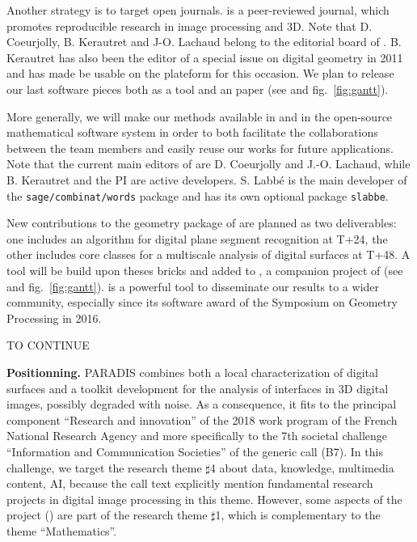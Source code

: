 Another strategy is to target open journals. {\IPOL} is a peer-reviewed journal, which promotes
reproducible research in image processing and 3D. Note that D. Coeurjolly, B. Kerautret and J-O. Lachaud
belong to the editorial board of {\IPOL}. B. Kerautret has also been the editor of a special issue on
digital geometry in 2011 and has made {\DGtal} be usable on the {\IPOL} plateform for this occasion. 
We plan to release our last software pieces both as a {\DGtal} tool and an {\IPOL} paper
(see  and fig.~\ref{fig:gantt}).

More generally, we will make our methods available in {\DGtal} 
and in the open-source mathematical software system {\sage}
in order to both facilitate the collaborations between the team members
and easily reuse our works for future applications.
Note that the current main editors of {\DGtal} are {D. Coeurjolly} and
{J.-O. Lachaud}, while {B. Kerautret} and the PI are active developers.
S. Labb\'{e} is the main developer of the \texttt{sage/combinat/words} package
and has its own optional package \texttt{slabbe}.

New contributions to the geometry package of
{\DGtal} are planned as two deliverables: one includes an algorithm for
digital plane segment recognition at T+24, the other includes core classes
for a multiscale analysis of digital surfaces at T+48. A tool will be build
upon theses bricks and added to {\DGtalTools}, a companion project of
{\DGtal} (see  and fig.~\ref{fig:gantt}).  
{\DGtal} is a powerful tool to disseminate our results to a wider community,
especially since its software award of the Symposium on Geometry Processing in 2016.


TO CONTINUE

\noindent\textbf{Positionning.}
PARADIS combines both a local characterization of digital surfaces 
and a toolkit development for the analysis of interfaces in 3D digital images, 
possibly degraded with noise. 
As a consequence, it fits to the principal component ``Research and innovation''
of the 2018 work program of the French National Research Agency 
and more specifically to the 7th societal challenge ``Information and Communication Societies''
of the generic call (B7).    
In this challenge, we target the research theme $\sharp$4 about data, knowledge, multimedia content, AI, 
because the call text explicitly mention fundamental research projects in digital image processing in this theme. However, some aspects of the project (\wpPattern) are part of the research theme $\sharp$1, 
which is complementary to the theme ``Mathematics''.    

